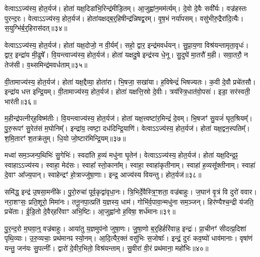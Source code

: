 वेत्वा\-ऽ\-ऽ\-ज्य॑स्य॒ होत॒र्यज॑।
होता॑ यक्ष॒दिडा॑भि॒रिन्द्र॑मीडि॒तम्।
आ॒जुह्वा॑न॒मम॑र्त्यम्।
दे॒वो दे॒वैः सवी᳚र्यः।
वज्र॑हस्तः पुरन्द॒रः।
वेत्वा\-ऽ\-ऽ\-ज्य॑स्य॒ होत॒र्यज॑।
होता॑यक्षद्ब॒र्॒हिषीन्द्र॑न्निषद्व॒रम्।
वृ॒ष॒भं नर्या॑पसम्।
वसु॑भीरु॒द्रैरा॑दि॒त्यैः।
स॒युग्भि॑र्ब॒र्॒हिरा\-स॑दत्॥३४॥

वेत्वा\-ऽ\-ऽ\-ज्य॑स्य॒ होत॒र्यज॑।
होता॑ यक्ष॒दोजो॒ न वी॒र्यम्᳚।
सहो॒ द्वार॒ इन्द्र॑मवर्धयन्।
सु॒प्रा॒य॒णा विश्र॑यन्तामृता॒वृधः॑।
द्वार॒ इन्द्रा॑य मी॒ढुषे᳚।
वि॒यन्त्वाज्य॑स्य॒ होत॒र्यज॑।
होता॑ यक्षदु॒षे इन्द्र॑स्य धे॒नू।
सु॒दुघे॑ मा॒तरौ॑ म॒ही।
सवा॒तरौ॒ न तेज॑सी।
व॒थ्समिन्द्र॑मवर्धताम्॥३५॥

वी॒तामाज्य॑स्य॒ होत॒र्यज॑।
होता॑ यक्ष॒द्दैव्या॒ होता॑रा।
भि॒षजा॒ सखा॑या।
ह॒विषेन्द्रं॑ भिषज्यतः।
क॒वी दे॒वौ प्रचे॑तसौ।
इन्द्रा॑य धत्त इन्द्रि॒यम्।
वी॒तामाज्य॑स्य॒ होत॒र्यज॑।
होता॑ यक्षत्ति॒स्रो दे॒वीः।
त्रय॑स्त्रि॒धात॑वो॒पसः॑।
इडा॒ सर॑स्वती॒ भार॑ती॥३६॥

म॒हीन्द्र॑पत्नीर्‌\mbox{}ह॒विष्म॑तीः।
वि॒यन्त्वाज्य॑स्य॒ होत॒र्यज॑।
होता॑ यक्ष॒त्त्वष्टा॑र॒मिन्द्रं॑ दे॒वम्।
भि॒षजꣳ॑ सु॒यजं॑ घृत॒श्रियम्᳚।
पु॒रु॒रूपꣳ॑ सु॒रेत॑सं म॒घोनिम्᳚।
इन्द्रा॑य॒ त्वष्टा॒ दध॑दिन्द्रि॒याणि॑।
वेत्वा\-ऽ\-ऽ\-ज्य॑स्य॒ होत॒र्यज॑।
होता॑ यक्ष॒द्वन॒स्पतिम्᳚।
श॒मि॒तारꣳ॑ श॒तक्र॑तुम्।
धि॒यो जो॒ष्टार॑मिन्द्रि॒यम्॥३७॥

मध्वा॑ सम॒ञ्जन्प॒थिभिः॑ सु॒गेभिः॑।
स्वदा॑ति ह॒व्यं मधु॑ना घृ॒तेन॑।
वेत्वा\-ऽ\-ऽ\-ज्य॑स्य॒ होत॒र्यज॑।
होता॑ यक्ष॒दिन्द्र॒ꣴ॒ स्वाहा\-ऽऽज्य॑स्य।
स्वाहा॒ मेद॑सः।
स्वाहा᳚ स्तो॒काना᳚म्।
स्वाहा॒ स्वाहा॑कृतीनाम्।
स्वाहा॑ ह॒व्यसू᳚क्तीनाम्।
स्वाहा॑ दे॒वाꣳ आ᳚ज्य॒पान्।
स्वाहेन्द्रꣳ॑ हो॒त्राज्जु॑षा॒णाः।
इन्द्र॒ आज्य॑स्य वियन्तु।
होत॒र्यज॑॥३८॥\anuvakamend[तेज॑सा\-ऽऽसददवर्धतां॒ भार॑तीन्द्रि॒यं जु॑षा॒णा द्वे च॑ (स॒मिधेन्द्र॒न्तनू॒नपा॑त॒मिडा॑भिर्ब॒र्॒हिष्योज॑ उ॒षे दैव्या॑ ति॒स्रस्त्वष्टा॑रं॒ वन॒स्पति॒मिन्द्रम्᳚॥ स॒मिधेन्द्रं॑ च॒तुर्वेत्वेको॑ वि॒यन्तु॒ द्विर्वी॒तामेको॑ वि॒यन्तु॒ द्विर्वेत्वेको॑ वि॒यन्तु॒ होत॒र्यज॑॥)]

समि॑द्ध॒ इन्द्र॑ उ॒षसा॒मनी॑के।
पु॒रो॒रुचा॑ पूर्व॒कृद्वा॑वृधा॒नः।
त्रि॒भिर्दे॒वैस्त्रि॒ꣳ॒शता॒ वज्र॑बाहुः।
ज॒घान॑ वृ॒त्रं वि दुरो॑ ववार।
नरा॒शꣳसः॒ प्रति॒शूरो॒ मिमा॑नः।
तनू॒नपा॒त्प्रति॑ य॒ज्ञस्य॒ धाम॑।
गोभि॑र्व॒पावा॒न्मधु॑ना सम॒ञ्जन्।
हिर॑ण्यैश्च॒न्द्री य॑जति॒ प्रचे॑ताः।
ई॒डि॒तो दे॒वैर्‌\mbox{}हरि॑वाꣳ अभि॒ष्टिः।
आ॒जुह्वा॑नो ह॒विषा॒ शर्ध॑मानः॥३९॥

पु॒र॒न्द॒रो म॒घवा॒न्॒ वज्र॑बाहुः।
आया॑तु य॒ज्ञमुप॑नो जुषा॒णः।
जु॒षा॒णो ब॒र्‌॒\mbox{}हिर्\mbox{}हरि॑वान्न॒ इन्द्रः॑।
प्रा॒चीनꣳ॑ सीदत्प्र॒दिशा॑ पृथि॒व्याः।
उ॒रु॒व्यचाः॒ प्रथ॑मानꣴ स्यो॒नम्।
आ॒दि॒त्यैर॒क्तं वसु॑भिः स॒जोषाः᳚।
इन्द्रं॒ दुरः॑ कव॒ष्यो॑ धाव॑मानाः।
वृषा॑णं यन्तु॒ जन॑यः सु॒पत्नीः᳚।
द्वारो॑ दे॒वीर॒भितो॒ विश्र॑यन्ताम्।
सु॒वीरा॑ वी॒रं प्रथ॑माना॒ महो॑भिः॥४०॥

